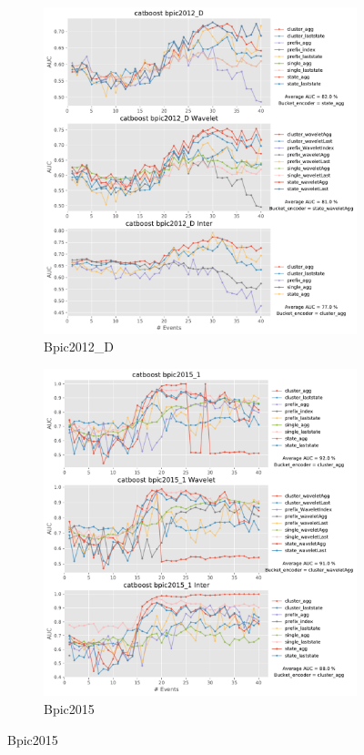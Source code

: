 \documentclass[twoside,11pt]{Latex/Classes/PhDthesisPSnPDF}
\begin{document}
\begin{figure}[!htbp] %

	\begin{subfigure}{0.48\textwidth}
		\includegraphics[width=\linewidth]{images/inter/catboost/bpic2012_D.pdf}
		\caption{Bpic2012\_D} \label{fig:b12di}
	\end{subfigure}\hspace*{\fill}
	\begin{subfigure}{0.48\textwidth}
		\includegraphics[width=\linewidth]{images/inter/catboost/bpic2015_1.pdf}
		\caption{Bpic2015} \label{fig:b151i}
	\end{subfigure}
	

\end{figure}
\end{document}
